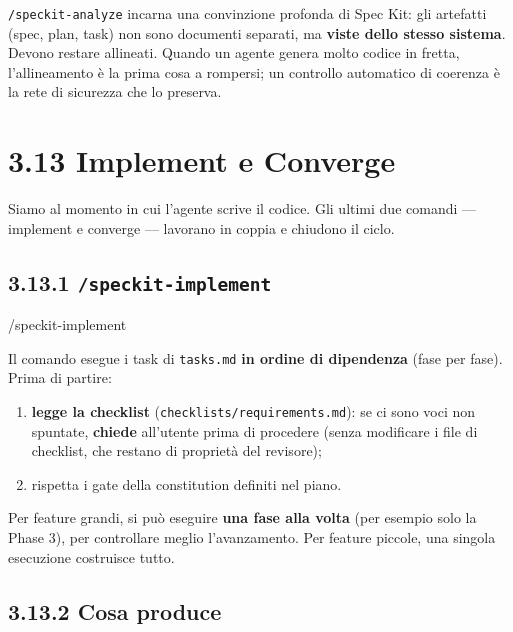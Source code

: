 \documentclass[
  italian,
  10pt,
]{book}
\newenvironment{Shaded}{\begin{snugshade}}{\end{snugshade}}
\newcommand{\NormalTok}[1]{#1}
\providecommand{\tightlist}{%
  \setlength{\itemsep}{0pt}\setlength{\parskip}{0pt}}
\begin{document}
\texttt{/speckit-analyze} incarna una convinzione profonda di Spec Kit:
gli artefatti (spec, plan, task) non sono documenti separati, ma
\textbf{viste dello stesso sistema}. Devono restare allineati. Quando un
agente genera molto codice in fretta, l'allineamento è la prima cosa a
rompersi; un controllo automatico di coerenza è la rete di sicurezza che
lo preserva.

\section{3.13 Implement e Converge}\label{implement-e-converge}

Siamo al momento in cui l'agente scrive il codice. Gli ultimi due
comandi --- implement e converge --- lavorano in coppia e chiudono il
ciclo.

\subsection{\texorpdfstring{3.13.1
\texttt{/speckit-implement}}{3.13.1 /speckit-implement}}\label{speckit-implement}

\begin{Shaded}
\begin{Highlighting}[]
\NormalTok{/speckit{-}implement}
\end{Highlighting}
\end{Shaded}

Il comando esegue i task di \texttt{tasks.md} \textbf{in ordine di
dipendenza} (fase per fase). Prima di partire:

\begin{enumerate}
\def\labelenumi{\arabic{enumi}.}
\tightlist
\item
  \textbf{legge la checklist} (\texttt{checklists/requirements.md}): se
  ci sono voci non spuntate, \textbf{chiede} all'utente prima di
  procedere (senza modificare i file di checklist, che restano di
  proprietà del revisore);
\item
  rispetta i gate della constitution definiti nel piano.
\end{enumerate}

Per feature grandi, si può eseguire \textbf{una fase alla volta} (per
esempio solo la Phase 3), per controllare meglio l'avanzamento. Per
feature piccole, una singola esecuzione costruisce tutto.

\subsection{3.13.2 Cosa produce}\label{cosa-produce}
\end{document}
